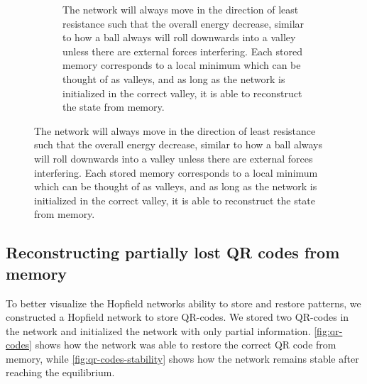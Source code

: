 \begin{figure}[H]
\begin{subfigure}{0.49\textwidth}
        \caption{The network will always move in the direction of least resistance such that the overall energy decrease, similar to how a ball always will roll downwards into a valley unless there are external forces interfering. Each stored memory corresponds to a local minimum which can be thought of as valleys, and as long as the network is initialized in the correct valley, it is able to reconstruct the state from memory.}
    \end{subfigure}
\end{figure}
 

\subsection{Reconstructing partially lost QR codes from memory} \label{sec:qr-codes}
To better visualize the Hopfield networks ability to store and restore patterns, we constructed a Hopfield network to store QR-codes. We stored two QR-codes in the network and initialized the network with only partial information. \cref{fig:qr-codes} shows how the network was able to restore the correct QR code from memory, while \cref{fig:qr-codes-stability} shows how the network remains stable after reaching the equilibrium.
